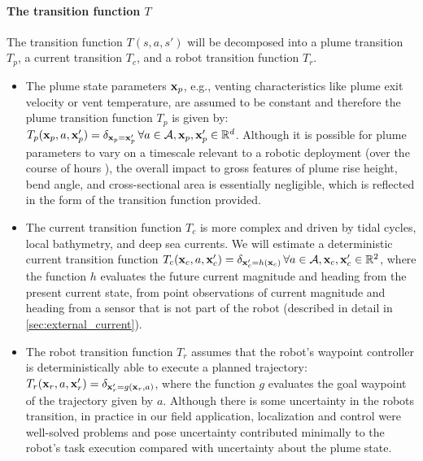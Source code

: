 \paragraph{The transition function $T$} The transition function $T(s, a, s')$ will be decomposed into a plume transition $T_p$, a current transition $T_c$, and a robot transition function $T_r$.
\begin{itemize}
	\item The plume state parameters $\mathbf{x}_p$, e.g., venting characteristics like plume exit velocity or vent temperature, are assumed to be constant and therefore the plume transition function $T_p$ is given by: $T_p(\mathbf{x}_p, a, \mathbf{x}_p') = \delta_{\mathbf{x}_p = \mathbf{x}_p'} \, \forall a \in \mathcal{A}, \mathbf{x}_p, \mathbf{x}_p' \in \mathbb{R}^d$. Although it is possible for plume parameters to vary on a timescale relevant to a robotic deployment (over the course of hours \autocite{chevaldonne1991time}), the overall impact to gross features of plume rise height, bend angle, and cross-sectional area is essentially negligible, which is reflected in the form of the transition function provided.
	\item The current transition function $T_c$ is more complex and driven by tidal cycles, local bathymetry, and deep sea currents. We will estimate a deterministic current transition function $T_c(\mathbf{x}_c, a, \mathbf{x}_c') = \delta_{\mathbf{x}_c' = h(\mathbf{x}_c)} \, \forall a \in \mathcal{A}, \mathbf{x}_c, \mathbf{x}_c' \in \mathbb{R}^2$, where the function $h$ evaluates the future current magnitude and heading from the present current state, from point observations of current magnitude and heading from a sensor that is not part of the robot (described in detail in \cref{sec:external_current}). 
	\item The robot transition function $T_r$ assumes that the robot's waypoint controller is deterministically able to execute a planned trajectory: $T_r(\mathbf{x}_r, a, \mathbf{x}_r') = \delta_{\mathbf{x}_r' = g(\mathbf{x}_r, a)}$, where the function $g$ evaluates the goal waypoint of the trajectory given by $a$. Although there is some uncertainty in the robots transition, in practice in our field application, localization and control were well-solved problems and pose uncertainty contributed minimally to the robot's task execution compared with uncertainty about the plume state.
\end{itemize}


